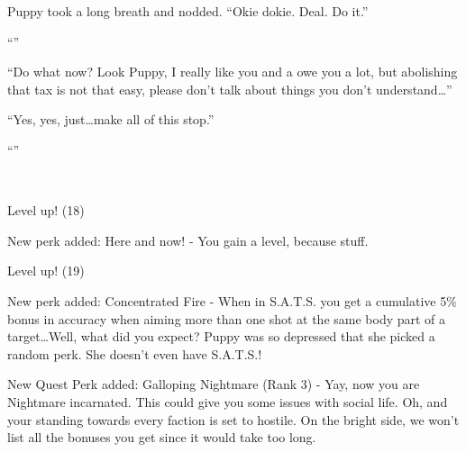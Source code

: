 Puppy took a long breath and nodded. ``Okie dokie. Deal. Do it.''

``''

``Do what now? Look Puppy, I really like you and a owe you a lot, but abolishing that tax is not that easy, please don't talk about things you don't understand\dots''

``Yes, yes, just\dots make all of this stop.''

``''

~\vfill

\begin{engnote}
    Level up! (18)
    
    New perk added: Here and now! - You gain a level, because stuff.
\end{engnote}
    
\begin{engnote}
    Level up! (19)
    
    New perk added: Concentrated Fire - When in S.A.T.S. you get a cumulative 5\% bonus in accuracy when aiming more than one shot at the same body part of a target\dots Well, what did you expect? Puppy was so depressed that she picked a random perk. She doesn't even have S.A.T.S.!
    
    New Quest Perk added: Galloping Nightmare (Rank 3) - Yay, now you are Nightmare incarnated. This could give you some issues with social life. Oh, and your standing towards every faction is set to hostile. On the bright side, we won't list all the bonuses you get since it would take too long.
\end{engnote}


